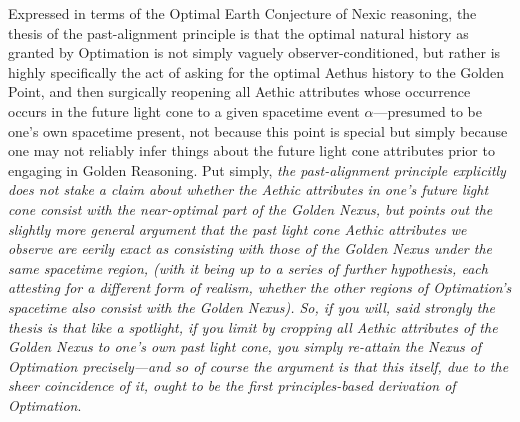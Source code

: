 \documentclass[11pt]{article}
\numberwithin{equation}{section}
\theoremstyle{plain}
\theoremstyle{definition}
\theoremstyle{remark}
\begin{document}
\begin{prince}
    Expressed in terms of the Optimal Earth Conjecture of Nexic reasoning, the thesis of the past-alignment principle is that the optimal natural history as granted by Optimation is not simply vaguely observer-conditioned, but rather is highly specifically the act of asking for the optimal Aethus history to the Golden Point, and then surgically reopening all Aethic attributes whose occurrence occurs in the future light cone to a given spacetime event $\alpha$---presumed to be one's own spacetime present, not because this point is special but simply because one may not reliably infer things about the future light cone attributes prior to engaging in Golden Reasoning. Put simply, \emph{the past-alignment principle explicitly does not stake a claim about whether the Aethic attributes in one's future light cone consist with the near-optimal part of the Golden Nexus, but points out the slightly more general argument that the past light cone Aethic attributes we observe are eerily exact as consisting with those of the Golden Nexus under the same spacetime region, (with it being up to a series of further hypothesis, each attesting for a different form of realism, whether the other regions of Optimation's spacetime also consist with the Golden Nexus). So, if you will, said strongly the thesis is that like a spotlight, if you limit by cropping all Aethic attributes of the Golden Nexus to one's own past light cone, you simply re-attain the Nexus of Optimation precisely---and so of course the argument is that this itself, due to the sheer coincidence of it, ought to be the first principles-based derivation of Optimation}.
\end{prince}
\end{document}
